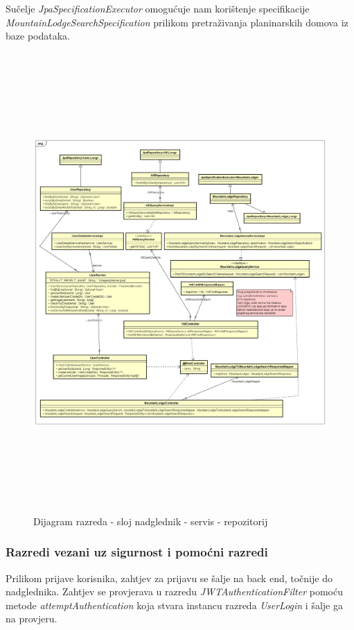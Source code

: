 			  Sučelje \textit{JpaSpecificationExecutor} omogućuje nam korištenje specifikacije \textit{MountainLodgeSearchSpecification} prilikom pretraživanja planinarskih domova iz baze podataka.
			\begin{figure}[H]
				\includegraphics[scale=0.6, height=175mm, width=165mm]{dijagrami/rest.png} %
				\centering
				\caption{Dijagram razreda - sloj nadglednik - servis - repozitorij}
				\label{fig:dijagrami_razreda4}
			\end{figure}
			\newpage
			\subsubsection{Razredi vezani uz sigurnost i pomoćni razredi}
			Prilikom prijave korisnika, zahtjev za prijavu se šalje na back end, točnije do nadglednika. Zahtjev se provjerava u razredu \textit{JWTAuthenticationFilter} pomoću metode \textit{attemptAuthentication} koja stvara instancu razreda \textit{UserLogin} i šalje ga na provjeru.
			 
